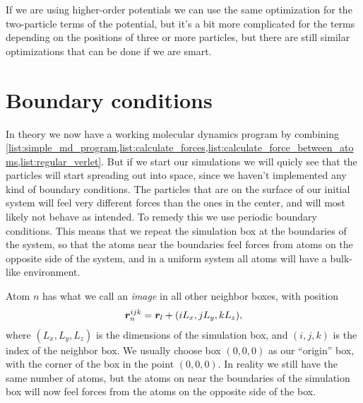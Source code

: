 If we are using higher-order potentials we can use the same optimization for the two-particle terms of the potential, but it's a bit more complicated for the terms depending on the positions of three or more particles, but there are still similar optimizations that can be done if we are smart.




\section{Boundary conditions}
In theory we now have a working molecular dynamics program by combining \cref{list:simple_md_program,list:calculate_forces,list:calculate_force_between_atoms,list:regular_verlet}. But if we start our simulations we will quicly see that the particles will start spreading out into space, since we haven't implemented any kind of boundary conditions. The particles that are on the surface of our initial system will feel very different forces than the ones in the center, and will most likely not behave as intended. To remedy this we use periodic boundary conditions. This means that we repeat the simulation box at the boundaries of the system, so that the atoms near the boundaries feel forces from atoms on the opposite side of the system, and in a uniform system all atoms will have a bulk-like environment. 

Atom $n$ has what we call an \emph{image} in all other neighbor boxes, with position
\begin{align}
    \boldsymbol{r}_n^{ijk} = \boldsymbol{r}_l + (iL_x, jL_y, kL_z),
    \label{eq:pbc_positions}
\end{align}
where $(L_x, L_y, L_z)$ is the dimensions of the simulation box, and $(i, j, k)$ is the index of the neighbor box. We usually choose box $(0,0,0)$ as our ``origin'' box, with the corner of the box in the point $(0,0,0)$. In reality we still have the same number of atoms, but the atoms on near the boundaries of the simulation box will now feel forces from the atoms on the opposite side of the box.

